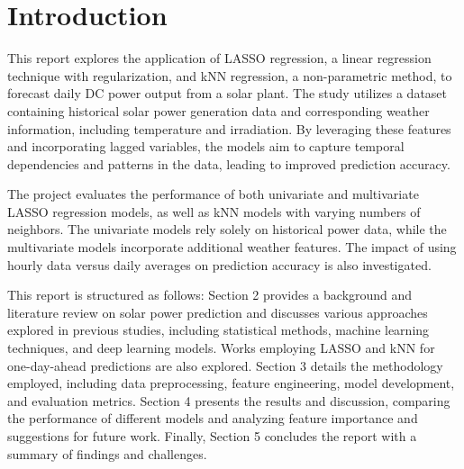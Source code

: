 \section{Introduction}
This report explores the application of LASSO regression, a linear regression technique with regularization, and kNN regression, a non-parametric method, to forecast daily DC power output from a solar plant. The study utilizes a dataset containing historical solar power generation data and corresponding weather information, including temperature and irradiation. By leveraging these features and incorporating lagged variables, the models aim to capture temporal dependencies and patterns in the data, leading to improved prediction accuracy.

The project evaluates the performance of both univariate and multivariate LASSO regression models, as well as kNN models with varying numbers of neighbors. The univariate models rely solely on historical power data, while the multivariate models incorporate additional weather features. The impact of using hourly data versus daily averages on prediction accuracy is also investigated.

This report is structured as follows: Section 2 provides a background and literature review on solar power prediction and discusses various approaches explored in previous studies, including statistical methods, machine learning techniques, and deep learning models. Works employing LASSO and kNN for one-day-ahead predictions are also explored. Section 3 details the methodology employed, including data preprocessing, feature engineering, model development, and evaluation metrics. Section 4 presents the results and discussion, comparing the performance of different models and analyzing feature importance and suggestions for future work. Finally, Section 5 concludes the report with a summary of findings and challenges.